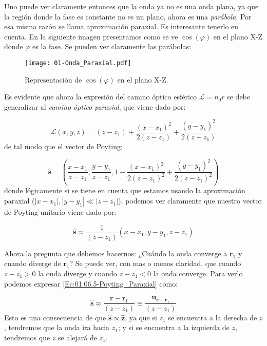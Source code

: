 \documentclass[12pt,a4paper]{book}
\numberwithin{equation}{section}
\numberwithin{figure}{section}
\newcommand{\parentesis}[1]{\left( #1  \right)}
\newcommand{\1}{_{(1)}}
\newcommand{\2}{_{(2)}}
\newcommand{\zn}{\mathbf{z}}
\newcommand{\un}{\mathbf{u}}
\newcommand{\rn}{\mathbf{r}}
\newcommand{\sn}{\mathbf{s}}
\newcommand{\hns}{\hat{\sn}}
\newcommand{\hnz}{\hat{\zn}}
\theoremstyle{definition}
\begin{document}
Uno puede ver claramente entonces que la onda ya no es una onda plana, ya que la región donde la fase es constante no es un plano, ahora es una \textit{parábola}. Por esa misma razón se llama aproximación paraxial. Es interesante tenerlo en cuenta. En la siguiente imagen presentamos como se ve $\cos (\varphi)$ en el plano X-Z donde $\varphi$ es la fase. Se pueden ver claramente las parábolas:

\begin{figure}[h!] \centering
\texttt{[image: 01-Onda\_Paraxial.pdf]}
\caption{Representación de $\cos(\varphi)$ en el plano X-Z.}
\end{figure}

Es evidente que ahora la expresión del camino óptico esférico $\mathcal{L}= n_0 r$ se debe generalizar al \textit{camino óptico paraxial}, que viene dado por:

\begin{equation}
\mathcal{L} (x,y,z) = (z-z_1)+\frac{(x-x_1)^2}{2(z-z_1)} + \frac{(y-y_1)^2}{2(z-z_1)}
\end{equation}
de tal modo que el vector de Poyting:

\begin{equation}
\hns =  \parentesis{\frac{x-x_1}{z-z_1}, \frac{y-y_1}{z-z_1}, 1 - \frac{(x-x_1)^2}{2(z-z_1)^2} + \frac{(y-y_1)^2}{2(z-z_1)^2}}
\end{equation}
donde lógicamente si se tiene en cuenta que estamos usando la aproximación paraxial ($|x-x_1|,|y-y_1|\ll|z-z_1|$), podemos ver claramente que nuestro vector de Poyting unitario viene dado por:

\begin{equation}
\hns \approx \frac{1}{(z-z_1)} \parentesis{x-x_1,y-y_1,z-z_1} \label{Ec:01.06.5-Poyting_Paraxial}
\end{equation}

Ahora la pregunta que debemos hacernos: ¿Cuándo la onda converge a $\rn_1$ y cuando diverge de $\rn_1$? Se puede ver, con mas o menos claridad, que cuando $z-z_1>0$ la onda diverge y cuando $z-z_1<0$ la onda converge. Para verlo podemos expresar \ref{Ec:01.06.5-Poyting_Paraxial} como:

\begin{equation}
\hns \approx \frac{\rn - \rn_1}{(z-z_1)}  \equiv \frac{\un_{\rn-\rn_1}}{(z-z_1)}
\end{equation} 
Esto es una consecuencia de que $\hns \propto \hnz$, ya que si $z_1$ se encuentra a la derecha de $z$, tendremos que la onda ira hacia $z_1$; y si se encuentra a la izquierda de $z$, tendremos que $z$ se alejará de $z_1$. 
\end{document}
